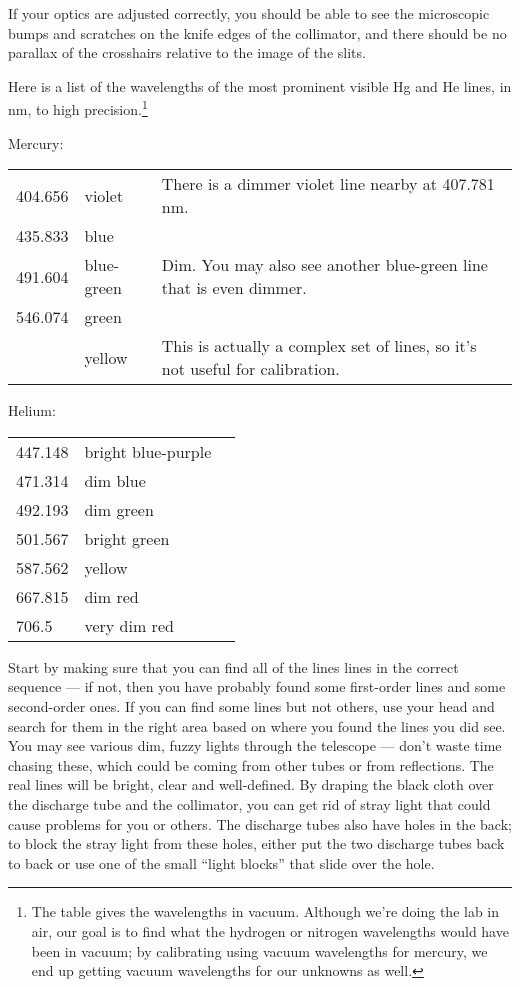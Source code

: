 If your optics are adjusted correctly,
you should be able to see the microscopic
bumps and scratches on the knife edges of the collimator,
and there should be no parallax of the crosshairs relative
to the image of the slits.

Here is a list of the wavelengths of the most prominent visible Hg and He lines, in nm, to high 
precision.\footnote{The table gives the wavelengths in vacuum. Although we're doing the lab in air, our goal is to find
what the hydrogen or nitrogen wavelengths would have been in vacuum; by calibrating using vacuum wavelengths
for mercury, we end up getting vacuum wavelengths for our unknowns as well.}

Mercury:\\
\noindent\begin{tabular}{llp{40mm}}
404.656  & violet & There is a dimmer violet line nearby at 407.781 nm.\\
435.833  & blue & \\
491.604  & blue-green & Dim. You may also see another blue-green line that is even dimmer. \\
546.074  & green & \\
         & yellow & This is actually a complex set of lines, so it's not useful for calibration.
\end{tabular}

Helium:\\
\noindent\begin{tabular}{llp{40mm}}
447.148 & bright blue-purple & \\
471.314 & dim blue & \\
492.193 & dim green & \\
501.567 & bright green & \\
587.562 & yellow & \\
667.815 & dim red & \\
706.5 & very dim red
\end{tabular}

Start by making sure
that you can find all of the lines lines in the correct sequence --- if
not, then you have probably found some first-order
lines and some second-order ones. If you can find some lines
but not others, use your head and search for them in the
right area based on where you found the lines you did see.
You may see various dim, fuzzy lights through the telescope
--- don't waste time chasing these, which could be coming
from other tubes or from reflections. The real lines will be
bright, clear and well-defined. By draping the black cloth over
the discharge tube and the collimator, you can get rid of stray
light that could cause problems for you or others. The discharge tubes also have
holes in the back; to block the stray
light from these holes, either put the two discharge tubes back
to back or use one of the small ``light blocks'' that slide over the hole.

